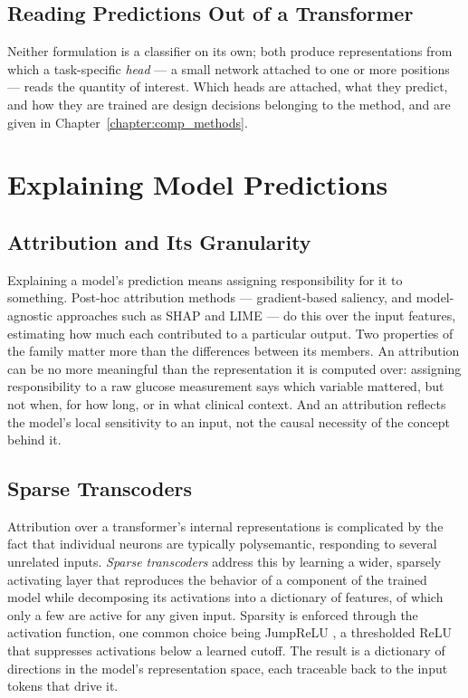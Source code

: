 \subsection{Reading Predictions Out of a Transformer}

Neither formulation is a classifier on its own; both produce representations from which a task-specific \emph{head} --- a small network attached to one or more positions --- reads the quantity of interest. Which heads are attached, what they predict, and how they are trained are design decisions belonging to the method, and are given in Chapter~\ref{chapter:comp_methods}.

\section{Explaining Model Predictions}
\label{sec:prelim-xai}

\subsection{Attribution and Its Granularity}

Explaining a model's prediction means assigning responsibility for it to something. Post-hoc attribution methods --- gradient-based saliency, and model-agnostic approaches such as SHAP \citep{unified-approach-interpreting-model-predictions} and LIME \citep{why-should-i-trust-you-explaining-predictions-any-classifier} --- do this over the input features, estimating how much each contributed to a particular output. Two properties of the family matter more than the differences between its members. An attribution can be no more meaningful than the representation it is computed over: assigning responsibility to a raw glucose measurement says which variable mattered, but not when, for how long, or in what clinical context. And an attribution reflects the model's local sensitivity to an input, not the causal necessity of the concept behind it.

\subsection{Sparse Transcoders}

Attribution over a transformer's internal representations is complicated by the fact that individual neurons are typically polysemantic, responding to several unrelated inputs. \emph{Sparse transcoders} \citep{dunefsky2024transcoders} address this by learning a wider, sparsely activating layer that reproduces the behavior of a component of the trained model while decomposing its activations into a dictionary of features, of which only a few are active for any given input. Sparsity is enforced through the activation function, one common choice being JumpReLU \citep{rajamanoharan2024jumping}, a thresholded ReLU that suppresses activations below a learned cutoff. The result is a dictionary of directions in the model's representation space, each traceable back to the input tokens that drive it.

